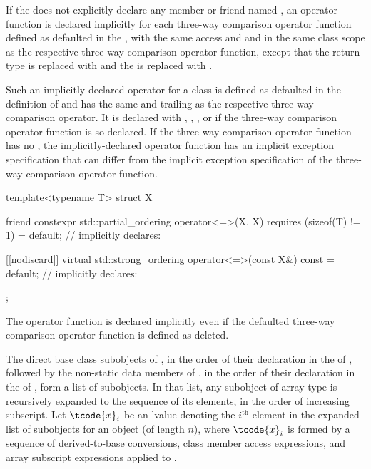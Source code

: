 \pnum
If the 
does not explicitly declare
any member or friend named ,
an \tcode{==} operator function is declared implicitly
for each three-way comparison operator function
defined as defaulted in the ,
with the same access and  and
in the same class scope as
the respective three-way comparison operator function,
except that the return type is replaced with  and
the  is replaced with .
\begin{note}
Such an implicitly-declared \tcode{==} operator for a class 
is defined as defaulted
in the definition of  and
has the same  and
trailing  as
the respective three-way comparison operator.
It is declared with , , ,
or  if
the three-way comparison operator function is so declared.
If the three-way comparison operator function
has no ,
the implicitly-declared \tcode{==} operator function
has an implicit exception specification that
can differ from the implicit exception specification of
the three-way comparison operator function.
\end{note}
\begin{example}
\begin{codeblock}
template<typename T> struct X {
  friend constexpr std::partial_ordering operator<=>(X, X) requires (sizeof(T) != 1) = default;
  // implicitly declares: 

  [[nodiscard]] virtual std::strong_ordering operator<=>(const X&) const = default;
  // implicitly declares: 
};
\end{codeblock}
\end{example}
\begin{note}
The \tcode{==} operator function is declared implicitly even if
the defaulted three-way comparison operator function
is defined as deleted.
\end{note}

\pnum
The direct base class subobjects of ,
in the order of their declaration in the  of ,
followed by the non-static data members of ,
in the order of their declaration in the  of ,
form a list of subobjects.
In that list, any subobject of array type is recursively expanded
to the sequence of its elements, in the order of increasing subscript.
Let $\tcode{x}_i$ be an lvalue denoting the $i^\text{th}$ element
in the expanded list of subobjects for an object 
(of length $n$),
where $\tcode{x}_i$ is
formed by a sequence of
derived-to-base conversions,
class member access expressions, and
array subscript expressions applied to .

